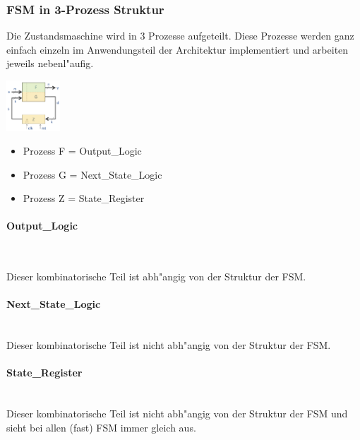 		\subsubsection{FSM in 3-Prozess Struktur}
			Die Zustandsmaschine wird in 3 Prozesse aufgeteilt. Diese Prozesse werden ganz 
			einfach einzeln im Anwendungsteil der Architektur implementiert und arbeiten 
			jeweils nebenl"aufig.
			\begin{multicols}{2}
				\begin{center}
					\includegraphics[width=0.15\textwidth]{pics/fsmprocesslogic}
				\end{center}
				\begin{itemize}
					\item Prozess F = Output\_Logic
					\item Prozess G = Next\_State\_Logic
					\item Prozess Z = State\_Register
				\end{itemize}
			\end{multicols}
			\paragraph{Output\_Logic}  $\;$ \\
				\begin{multicols}{2}
					Dieser kombinatorische Teil ist abh"angig von der Struktur der FSM.
					
				\end{multicols}
			\begin{multicols}{2}
				\paragraph{Next\_State\_Logic}  $\;$ \\
					Dieser kombinatorische Teil ist nicht abh"angig von der Struktur der 
					FSM.
					
				\paragraph{State\_Register}  $\;$ \\
					Dieser kombinatorische Teil ist nicht abh"angig von der Struktur der 
					FSM und sieht bei allen (fast) FSM immer gleich aus.
					
			\end{multicols}
	
